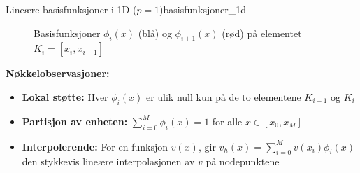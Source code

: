 \begin{example}{Lineære basisfunksjoner i 1D ($p=1$)}{basisfunksjoner_1d}
    \begin{figure}[H]
        \centering
        \caption{Basisfunksjoner $\phi_i(x)$ (blå) og $\phi_{i+1}(x)$ (rød) på elementet $K_i = [x_i, x_{i+1}]$}
        \label{fig:basis_function_element}
    \end{figure}

    \textbf{Nøkkelobservasjoner:}
    \begin{itemize}
        \item \textbf{Lokal støtte:} Hver $\phi_i(x)$ er ulik null kun på de to elementene $K_{i-1}$ og $K_i$
        \item \textbf{Partisjon av enheten:} $\sum_{i=0}^{M} \phi_i(x) = 1$ for alle $x \in [x_0, x_{M}]$
        \item \textbf{Interpolerende:} For en funksjon $v(x)$, gir $v_h(x) = \sum_{i=0}^M v(x_i) \phi_i(x)$ den stykkevis lineære interpolasjonen av $v$ på nodepunktene
    \end{itemize}
\end{example}

